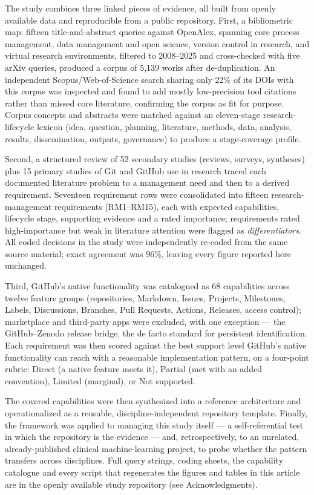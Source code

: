 \documentclass{IEEEcsmag}
\begin{document}
The study combines three linked pieces of evidence, all built from openly available data and reproducible from a public repository. First, a bibliometric map: fifteen title-and-abstract queries against OpenAlex, spanning core process management, data management and open science, version control in research, and virtual research environments, filtered to 2008--2025 and cross-checked with five arXiv queries, produced a corpus of 5{,}139 works after de-duplication. An independent Scopus/Web-of-Science search sharing only 22\% of its DOIs with this corpus was inspected and found to add mostly low-precision tool citations rather than missed core literature, confirming the corpus as fit for purpose. Corpus concepts and abstracts were matched against an eleven-stage research-lifecycle lexicon (idea, question, planning, literature, methods, data, analysis, results, dissemination, outputs, governance) to produce a stage-coverage profile.

Second, a structured review of 52 secondary studies (reviews, surveys, syntheses) plus 15 primary studies of Git and GitHub use in research traced each documented literature problem to a management need and then to a derived requirement. Seventeen requirement rows were consolidated into fifteen research-management requirements (RM1--RM15), each with expected capabilities, lifecycle stage, supporting evidence and a rated importance; requirements rated high-importance but weak in literature attention were flagged as \emph{differentiators}. All coded decisions in the study were independently re-coded from the same source material; exact agreement was 96\%, leaving every figure reported here unchanged.

Third, GitHub's native functionality was catalogued as 68 capabilities across twelve feature groups (repositories, Markdown, Issues, Projects, Milestones, Labels, Discussions, Branches, Pull Requests, Actions, Releases, access control); marketplace and third-party apps were excluded, with one exception --- the GitHub--Zenodo release bridge, the de facto standard for persistent identification. Each requirement was then scored against the best support level GitHub's native functionality can reach with a reasonable implementation pattern, on a four-point rubric: Direct (a native feature meets it), Partial (met with an added convention), Limited (marginal), or Not supported.

The covered capabilities were then synthesized into a reference architecture and operationalized as a reusable, discipline-independent repository template. Finally, the framework was applied to managing this study itself --- a self-referential test in which the repository is the evidence --- and, retrospectively, to an unrelated, already-published clinical machine-learning project, to probe whether the pattern transfers across disciplines. Full query strings, coding sheets, the capability catalogue and every script that regenerates the figures and tables in this article are in the openly available study repository (see Acknowledgments).
\end{document}
